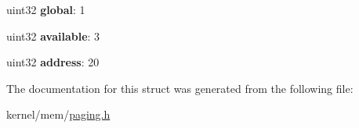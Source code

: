 \begin{DoxyCompactItemize}
\item 
\hypertarget{structpage__table__entry_ad187918bbc6b333bd8d89b3e4cb146f7}{
uint32 {\bfseries global}: 1}
\label{structpage__table__entry_ad187918bbc6b333bd8d89b3e4cb146f7}

\item 
\hypertarget{structpage__table__entry_ac3187aa5b0f41f238994042ea9a079c9}{
uint32 {\bfseries available}: 3}
\label{structpage__table__entry_ac3187aa5b0f41f238994042ea9a079c9}

\item 
\hypertarget{structpage__table__entry_a902e23bfbbb15627b6e9975b401ea627}{
uint32 {\bfseries address}: 20}
\label{structpage__table__entry_a902e23bfbbb15627b6e9975b401ea627}

\end{DoxyCompactItemize}


The documentation for this struct was generated from the following file:\begin{DoxyCompactItemize}
\item 
kernel/mem/\hyperlink{paging_8h}{paging.h}\end{DoxyCompactItemize}
